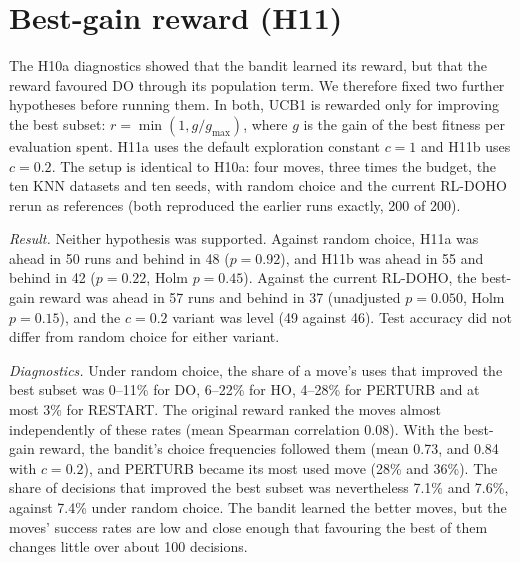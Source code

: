 \documentclass[journal]{IEEEtran}
\begin{document}
\section{Best-gain reward (H11)}
The H10a diagnostics showed that the bandit learned its reward, but that the reward favoured DO through its population term. We therefore fixed two further hypotheses before running them. In both, UCB1 is rewarded only for improving the best subset: $r=\min(1, g/g_{\max})$, where $g$ is the gain of the best fitness per evaluation spent. H11a uses the default exploration constant $c=1$ and H11b uses $c=0.2$. The setup is identical to H10a: four moves, three times the budget, the ten KNN datasets and ten seeds, with random choice and the current RL-DOHO rerun as references (both reproduced the earlier runs exactly, 200 of 200).

\emph{Result.} Neither hypothesis was supported. Against random choice, H11a was ahead in 50 runs and behind in 48 ($p=0.92$), and H11b was ahead in 55 and behind in 42 ($p=0.22$, Holm $p=0.45$). Against the current RL-DOHO, the best-gain reward was ahead in 57 runs and behind in 37 (unadjusted $p=0.050$, Holm $p=0.15$), and the $c=0.2$ variant was level (49 against 46). Test accuracy did not differ from random choice for either variant.

\emph{Diagnostics.} Under random choice, the share of a move's uses that improved the best subset was 0--11\% for DO, 6--22\% for HO, 4--28\% for PERTURB and at most 3\% for RESTART. The original reward ranked the moves almost independently of these rates (mean Spearman correlation 0.08). With the best-gain reward, the bandit's choice frequencies followed them (mean 0.73, and 0.84 with $c=0.2$), and PERTURB became its most used move (28\% and 36\%). The share of decisions that improved the best subset was nevertheless 7.1\% and 7.6\%, against 7.4\% under random choice. The bandit learned the better moves, but the moves' success rates are low and close enough that favouring the best of them changes little over about 100 decisions.
\end{document}
